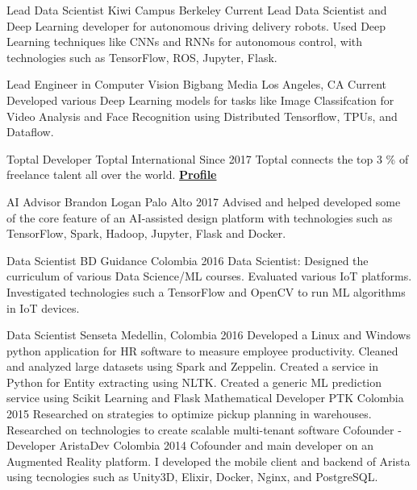 \begin{cventries}

  \cventry
    {Lead Data Scientist}
    {Kiwi Campus}
    {Berkeley}
    {Current}
    {
    Lead Data Scientist and Deep Learning developer for autonomous driving delivery robots. Used
    Deep Learning techniques like CNNs and RNNs for autonomous control,
    with technologies such as TensorFlow, ROS, Jupyter, Flask.
    }

  \cventry
    {Lead Engineer in Computer Vision}
    {Bigbang Media}
    {Los Angeles, CA}
    {Current}
    {
    Developed various Deep Learning models for tasks like Image Classifcation for Video Analysis 
    and Face Recognition using Distributed Tensorflow, TPUs, and Dataflow.
    }

  \cventry
    {Toptal Developer}
    {Toptal}
    {International}
    {Since 2017}
    {
      Toptal connects the top 3 \% of freelance talent all over the world. \href{https://www.toptal.com/resume/cristian-garcia}{\textbf{Profile}}
    }

  \cventry
    {AI Advisor}
    {Brandon Logan}
    {Palo Alto}
    {2017}
    {
    Advised and helped developed some of the core feature of an AI-assisted design platform
    with technologies such as TensorFlow, Spark, Hadoop, Jupyter, Flask and Docker.
    }

  \cventry
    {Data Scientist}
    {BD Guidance}
    {Colombia}
    {2016}
    {
    Data Scientist: Designed the curriculum of various
    Data Science/ML courses. Evaluated various IoT platforms. Investigated
    technologies such a TensorFlow and OpenCV to run ML algorithms in IoT
    devices.
    }

  \cventry
    {Data Scientist}
    {Senseta}
    {Medellin, Colombia}
    {2016}
    {
    Developed a Linux and Windows python
    application for HR software to measure employee productivity. Cleaned
    and analyzed large datasets using Spark and Zeppelin. Created a service in
    Python for Entity extracting using NLTK. Created a generic ML prediction
    service using Scikit Learning and Flask
    }
  \cventry
    {Mathematical Developer}
    {PTK}
    {Colombia}
    {2015}
    {
    Researched on strategies to optimize
    pickup planning in warehouses. Researched on technologies to create
    scalable multi-tenant software
    }
  \cventry
    {Cofounder - Developer}
    {AristaDev}
    {Colombia}
    {2014 }
    {
    Cofounder and main developer on an
    Augmented Reality platform. I developed the mobile client and backend
    of Arista using tecnologies such as Unity3D, Elixir, Docker, Nginx, and
    PostgreSQL.
    }
\end{cventries}
